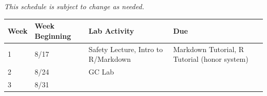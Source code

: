 \documentclass[]{tufte-book}
\begin{document}
\emph{This schedule is subject to change as needed.}

\begin{longtable}[]{@{}llll@{}}
\toprule
\begin{minipage}[b]{0.04\columnwidth}\raggedright
Week\strut
\end{minipage} & \begin{minipage}[b]{0.13\columnwidth}\raggedright
Week Beginning\strut
\end{minipage} & \begin{minipage}[b]{0.32\columnwidth}\raggedright
Lab Activity\strut
\end{minipage} & \begin{minipage}[b]{0.40\columnwidth}\raggedright
Due\strut
\end{minipage}\tabularnewline
\midrule
\endhead
\begin{minipage}[t]{0.04\columnwidth}\raggedright
1\strut
\end{minipage} & \begin{minipage}[t]{0.13\columnwidth}\raggedright
8/17\strut
\end{minipage} & \begin{minipage}[t]{0.32\columnwidth}\raggedright
Safety Lecture, Intro to R/Markdown\strut
\end{minipage} & \begin{minipage}[t]{0.40\columnwidth}\raggedright
Markdown Tutorial, R Tutorial (honor system)\strut
\end{minipage}\tabularnewline
\begin{minipage}[t]{0.04\columnwidth}\raggedright
2\strut
\end{minipage} & \begin{minipage}[t]{0.13\columnwidth}\raggedright
8/24\strut
\end{minipage} & \begin{minipage}[t]{0.32\columnwidth}\raggedright
GC Lab\strut
\end{minipage} & \begin{minipage}[t]{0.40\columnwidth}\raggedright
\strut
\end{minipage}\tabularnewline
\begin{minipage}[t]{0.04\columnwidth}\raggedright
3\strut
\end{minipage} & \begin{minipage}[t]{0.13\columnwidth}\raggedright
8/31\strut
\end{minipage} & \begin{minipage}[t]{0.32\columnwidth}\raggedright

\end{minipage}
\end{longtable}
\end{document}
